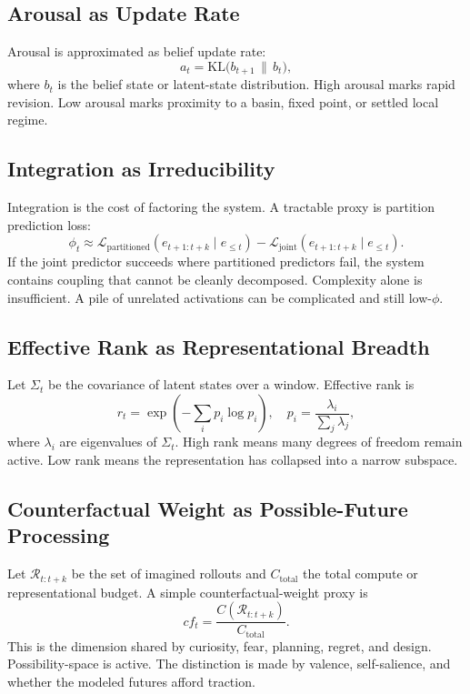 \documentclass[11pt]{article}
\newcommand{\R}{\mathcal{R}}
\newcommand{\KL}{\mathrm{KL}}
\begin{document}
\subsection{Arousal as Update Rate}

Arousal is approximated as belief update rate:
\begin{equation}
  a_t = \KL\big(b_{t+1}\,\|\,b_t\big),
\end{equation}
where $b_t$ is the belief state or latent-state distribution. High arousal marks rapid revision. Low arousal marks proximity to a basin, fixed point, or settled local regime.

\subsection{Integration as Irreducibility}

Integration is the cost of factoring the system. A tractable proxy is partition prediction loss:
\begin{equation}
  \phi_t \approx \mathcal{L}_{\mathrm{partitioned}}(e_{t+1:t+k}\mid e_{\le t}) - \mathcal{L}_{\mathrm{joint}}(e_{t+1:t+k}\mid e_{\le t}).
\end{equation}
If the joint predictor succeeds where partitioned predictors fail, the system contains coupling that cannot be cleanly decomposed. Complexity alone is insufficient. A pile of unrelated activations can be complicated and still low-$\phi$.

\subsection{Effective Rank as Representational Breadth}

Let $\Sigma_t$ be the covariance of latent states over a window. Effective rank is
\begin{equation}
  r_t = \exp\left(-\sum_i p_i\log p_i\right),\quad p_i = \frac{\lambda_i}{\sum_j \lambda_j},
\end{equation}
where $\lambda_i$ are eigenvalues of $\Sigma_t$. High rank means many degrees of freedom remain active. Low rank means the representation has collapsed into a narrow subspace.

\subsection{Counterfactual Weight as Possible-Future Processing}

Let $\R_{t:t+k}$ be the set of imagined rollouts and $C_{\mathrm{total}}$ the total compute or representational budget. A simple counterfactual-weight proxy is
\begin{equation}
  cf_t = \frac{C(\R_{t:t+k})}{C_{\mathrm{total}}}.
\end{equation}
This is the dimension shared by curiosity, fear, planning, regret, and design. Possibility-space is active. The distinction is made by valence, self-salience, and whether the modeled futures afford traction.
\end{document}
